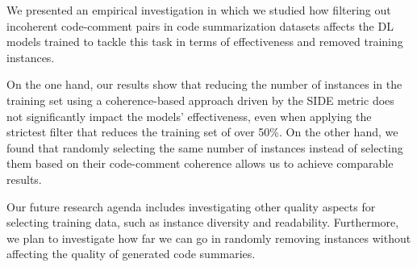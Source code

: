 
We presented an empirical investigation in which we studied how filtering out incoherent code-comment pairs in code summarization datasets affects the DL models trained to tackle this task in terms of effectiveness and removed training instances. 

On the one hand, our results show that reducing the number of instances in the training set using a coherence-based approach driven by the SIDE metric \cite{mastropaolo2024evaluating} does not significantly impact the models' effectiveness, even when applying the strictest filter that reduces the training set of over 50\%. On the other hand, we found that randomly selecting the same number of instances instead of selecting them based on their code-comment coherence allows us to achieve comparable results. 

Our future research agenda includes investigating other quality aspects for selecting training data, such as instance diversity and readability. Furthermore, we plan to investigate how far we can go in randomly removing instances without affecting the quality of generated code summaries.
